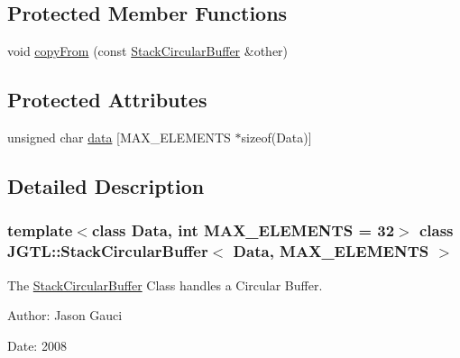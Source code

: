 \subsection*{Protected Member Functions}
\begin{CompactItemize}
\item 
void \hyperlink{class_j_g_t_l_1_1_stack_circular_buffer_e5e4f039f4463be0f086d52bb262a314}{copy\-From} (const \hyperlink{class_j_g_t_l_1_1_stack_circular_buffer}{Stack\-Circular\-Buffer} \&other)
\end{CompactItemize}
\subsection*{Protected Attributes}
\begin{CompactItemize}
\item 
unsigned char \hyperlink{class_j_g_t_l_1_1_stack_circular_buffer_dd8559d1e2f47be8c10154768a997bfa}{data} \mbox{[}MAX\_\-ELEMENTS $\ast$sizeof(Data)\mbox{]}
\end{CompactItemize}


\subsection{Detailed Description}
\subsubsection*{template$<$class Data, int MAX\_\-ELEMENTS = 32$>$ class JGTL::Stack\-Circular\-Buffer$<$ Data, MAX\_\-ELEMENTS $>$}

The \hyperlink{class_j_g_t_l_1_1_stack_circular_buffer}{Stack\-Circular\-Buffer} Class handles a Circular Buffer. 

\begin{Desc}
\item[Author:]Jason Gauci \end{Desc}
\begin{Desc}
\item[Date:]2008 \end{Desc}




